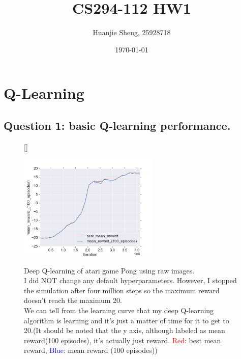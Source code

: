 \documentclass[12pt]{article}
\newcounter{question}
\begin{document}
	\title{CS294-112 HW1\vspace{-2ex}}
	\author{Huanjie Sheng, 25928718\vspace{-2ex}}
	\date{\today \vspace{-2ex}}
	
	\section{Q-Learning}
	\subsection{Question 1: basic Q-learning performance.}
	\begin{figure}[!htbp] 
		[\FBwidth]
		{\caption[caption]{
				Deep Q-learning of atari game Pong using raw images.  \\ \hspace{0.4\textwidth}
				I did NOT change any default hyperparameters.  However, I stopped the simulation after four million steps so the maximum reward doesn't reach the maximum 20. \\ \hspace{0.4\textwidth}
				We can tell from the learning curve that my deep Q-learning algorithm is learning and it's just a matter of time for it to get to 20.(It should be noted that the y axis, although labeled as mean reward(100 episodes), it's actually just reward. \textcolor{red}{Red}: best mean reward, \textcolor{blue}{Blue}: mean reward (100 episodes))
			}\label{fig:DQN}}
		{\includegraphics[width=0.6\textwidth]{question1_1.png}}
	\end{figure}
\end{document}
